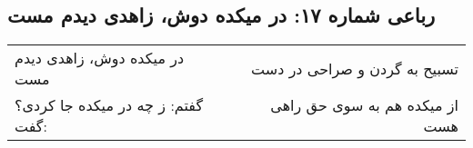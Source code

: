 \begin{center}
\section*{رباعی شماره ۱۷: در میکده دوش، زاهدی دیدم مست}
\label{sec:017}
\begin{longtable}{l p{0.5cm} r}
در میکده دوش، زاهدی دیدم مست
&&
تسبیح به گردن و صراحی در دست
\\
گفتم: ز چه در میکده جا کردی؟ گفت:
&&
از میکده هم به سوی حق راهی هست
\\
\end{longtable}
\end{center}

